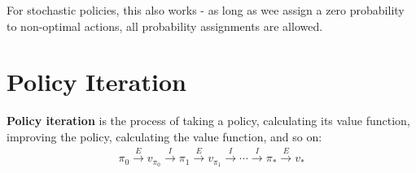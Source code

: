 \documentclass[a4paper,11pt,reqno]{amsart}
\newcounter{prob_counter}
\begin{document}
For stochastic policies, this also works - as long as wee assign a zero probability to non-optimal actions, all probability assignments are allowed. 

\section*{Policy Iteration}
\textbf{Policy iteration} is the process of taking a policy, calculating its value function, improving the policy, calculating the value function, and so on:
\begin{align}
\pi _0 \xrightarrow[]{E} v_{\pi _0} \xrightarrow[]{I} \pi _1 \xrightarrow[]{E} v_{\pi _1} \xrightarrow[]{I} \cdots  \xrightarrow[]{I}\pi _* \xrightarrow[]{E}v_{*}
\end{align}
\end{document}
